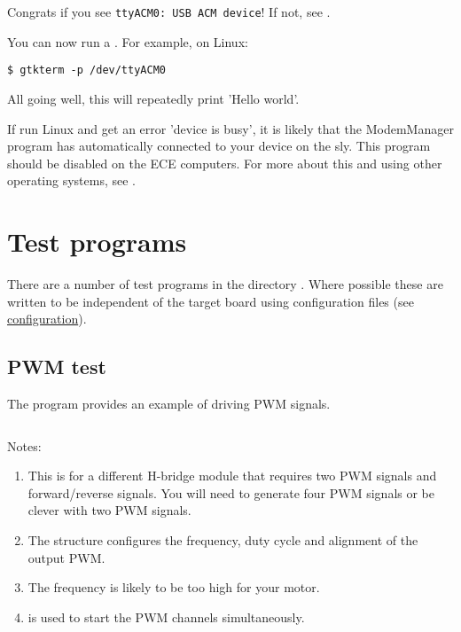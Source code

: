 Congrats if you see \texttt{ttyACM0:\ USB\ ACM\ device}!  If not, see
.

You can now run a . For example, on Linux:
%
\begin{verbatim}
$ gtkterm -p /dev/ttyACM0
\end{verbatim}

All going well, this will repeatedly print 'Hello world'.

If run Linux and get an error 'device is busy', it is likely that the
ModemManager program has automatically connected to your device on the
sly. This program should be disabled on the ECE computers. For more
about this and using other operating systems, see .

\section{Test programs}
\label{test-programs}

There are a number of test programs in the directory
.  Where possible these are written to be
independent of the target board using configuration files (see
\protect\hyperref[configuration]{configuration}).

\subsection{PWM test}
\label{pwm-test}

The program  provides an
example of driving PWM signals.

\inputminted{C}{../../src/test-apps/pwm_test2/pwm_test2.c}

Notes:
%
\begin{enumerate}
\item
  This is for a different H-bridge module that requires two PWM signals
  and forward/reverse signals. You will need to generate four PWM
  signals or be clever with two PWM signals.
\item
  The  structure configures the frequency, duty
  cycle and alignment of the output PWM.
\item The frequency is likely to be too high for your motor.
\item {} is used to start the PWM channels simultaneously.  
\end{enumerate}

